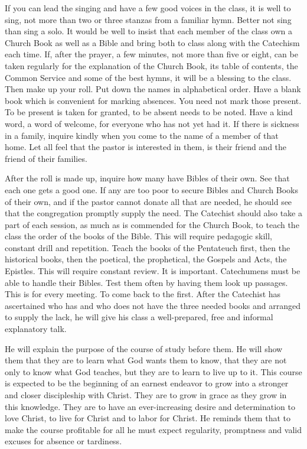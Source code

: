 If you can lead the singing and have a few good voices in the class, it is well to sing, not more than two or three stanzas from a familiar hymn. Better not sing than sing a solo. It would be well to insist that each member of the class own a Church Book as well as a Bible and bring both to class along with the Catechism each time. If, after the prayer, a few minutes, not more than five or eight, can be taken regularly for the explanation of the Church Book,
its table of contents, the Common Service and some of the best hymns, it will be a blessing to the class. Then make up your roll. Put down the names in alphabetical order. Have a blank book which is convenient for marking absences. You need not mark those present. To be present is taken for granted, to be absent needs to be noted. Have a kind word, a word of welcome, for everyone who has not yet had it. If there is sickness in a family, inquire kindly when you come to the name of a member of that home. Let all feel that the pastor is interested in them, is their friend and the friend of their families.


After the roll is made up, inquire how many have Bibles of their own. See that each one gets a good one. If any are too poor to secure Bibles and Church Books of their own, and if the pastor cannot donate all that are needed, he should see that the congregation promptly supply the need. The Catechist should also take a part of each session, as much as is commended for the Church Book, to teach the class the order of the books of the Bible. This will require pedagogic skill, constant drill and repetition. Teach the books of the Pentateuch first, then the historical books, then the poetical, the prophetical, the Gospels and Acts, the Epistles. This will require constant review. It is important. Catechumens must be able to handle their Bibles. Test them often by having
them look up passages. This is for every meeting. To come back to the first. After the Catechist has ascertained who has and who does not have the three needed books and arranged to supply the lack, he will give his class a well-prepared, free and informal explanatory talk.


He will explain the purpose of the course of study before them. He will show them that they are to learn what God wants them to know, that they are not only to know what God teaches, but they are to learn to live up to it. This course is expected to be the beginning of an earnest endeavor to grow into a stronger and closer discipleship with Christ. They are to grow in grace as they grow in this knowledge. They are to have an ever-increasing desire and determination to love Christ, to live for Christ and to labor for Christ. He reminds them that to make the course profitable for all he must expect regularity, promptness and valid excuses for absence or tardiness.

